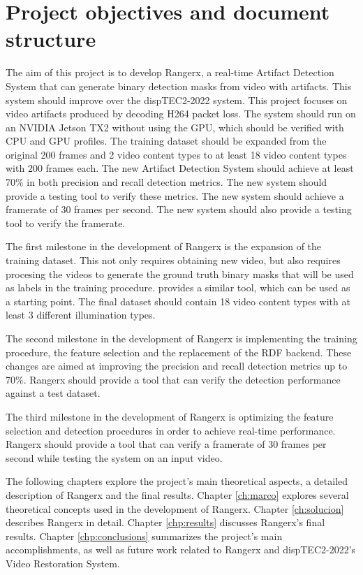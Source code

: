 \section{Project objectives and document structure}
\label{sec:intro_objectives}

The aim of this project is to develop Rangerx, a real-time Artifact Detection System that can generate binary detection masks from video with artifacts. This system should improve over the dispTEC2-2022 system. This project focuses on video artifacts produced by decoding H264 packet loss. The system should run on an NVIDIA Jetson TX2 without using the GPU, which should be verified with CPU and GPU profiles. The training dataset should be expanded from the original 200 frames and 2 video content types to at least 18 video content types with 200 frames each. The new Artifact Detection System should achieve at least 70\% in both precision and recall detection metrics. The new system should provide a testing tool to verify these metrics. The new system should achieve a framerate of 30 frames per second. The new system should also provide a testing tool to verify the framerate.

The first milestone in the development of Rangerx is the expansion of the training dataset. This not only requires obtaining new video, but also requires procesing the videos to generate the ground truth binary masks that will be used as labels in the training procedure. \cite{Brenes2022} provides a similar tool, which can be used as a starting point. The final dataset should contain 18 video content types with at least 3 different illumination types.

The second milestone in the development of Rangerx is implementing the training procedure, the feature selection and the replacement of the RDF backend. These changes are aimed at improving the precision and recall detection metrics up to 70\%. Rangerx should provide a tool that can verify the detection performance against a test dataset.

The third milestone in the development of Rangerx is optimizing the feature selection and detection procedures in order to achieve real-time performance. Rangerx should provide a tool that can verify a framerate of 30 frames per second while testing the system on an input video.

The following chapters explore the project's main theoretical aspects, a detailed description of Rangerx and the final results. Chapter \ref{ch:marco} explores several theoretical concepts used in the development of Rangerx. Chapter \ref{ch:solucion} describes Rangerx in detail. Chapter \ref{chp:results} discusses Rangerx's final results. Chapter \ref{chp:conclusions} summarizes the project's main accomplishments, as well as future work related to Rangerx and dispTEC2-2022's Video Restoration System.
